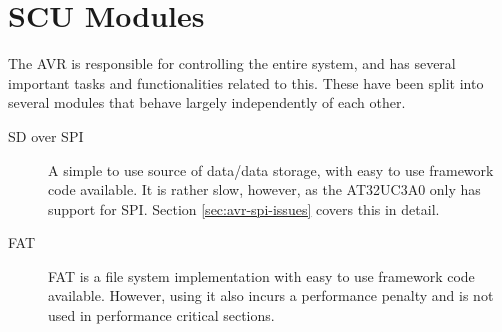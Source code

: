 \section{SCU Modules}
 

The AVR is responsible for controlling the entire system, and has several
important tasks and functionalities related to this. These have been split
into several modules that behave largely independently of each other.
\begin{description}

\item[SD over SPI] A simple to use source of data/data storage, with easy to use
  framework code available. It is rather slow, however, as the AT32UC3A0 only
  has support for SPI. Section \ref{sec:avr-spi-issues} covers this in detail.


\item[FAT] FAT is a file system implementation with easy to use framework
  code available. However, using it also incurs a performance penalty and is not
  used in performance critical sections.



\end{description}
